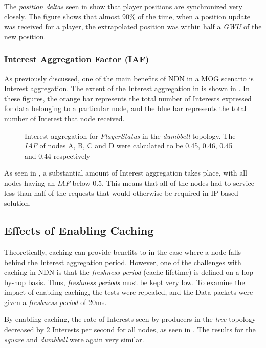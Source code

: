 The \textit{position deltas} seen in  show that player positions are synchronized very closely. The figure shows that almost 90\% of the time, when a position update was received for a player, the extrapolated position was within half a \textit{GWU} of the new position. 


\subsubsection*{Interest Aggregation Factor (IAF)}
As previously discussed, one of the main benefits of NDN in a MOG scenario is Interest aggregation. The extent of the Interest aggregation in \game{} is shown in . In these figures, the orange bar represents the total number of Interests expressed for data belonging to a particular node, and the blue bar represents the total number of Interest that node received. 

\begin{figure}[H]
    \centering
    \caption{Interest aggregation for \textit{PlayerStatus} in the \textit{dumbbell} topology. The \textit{IAF} of nodes A, B, C and D were calculated to be 0.45, 0.46, 0.45 and 0.44 respectively}
    \label{fig:eval:basic:interest-agg-dumbbell}
\end{figure}


As seen in , a substantial amount of Interest aggregation takes place, with all nodes having an \textit{IAF} below 0.5. This means that all of the nodes had to service less than half of the requests that would otherwise be required in IP based solution.

\subsection{Effects of Enabling Caching}
Theoretically, caching can provide benefits to \game{} in the case where a node falls behind the Interest aggregation period. However, one of the challenges with caching in NDN is that the \textit{freshness period} (cache lifetime) is defined on a hop-by-hop basis. Thus, \textit{freshness periods} must be kept very low. To examine the impact of enabling caching, the tests were repeated, and the Data packets were given a \textit{freshness period} of 20ms.

By enabling caching, the rate of Interests seen by producers in the \textit{tree} topology decreased by 2 Interests per second for all nodes, as seen in . The results for the \textit{square} and \textit{dumbbell} were again very similar.

